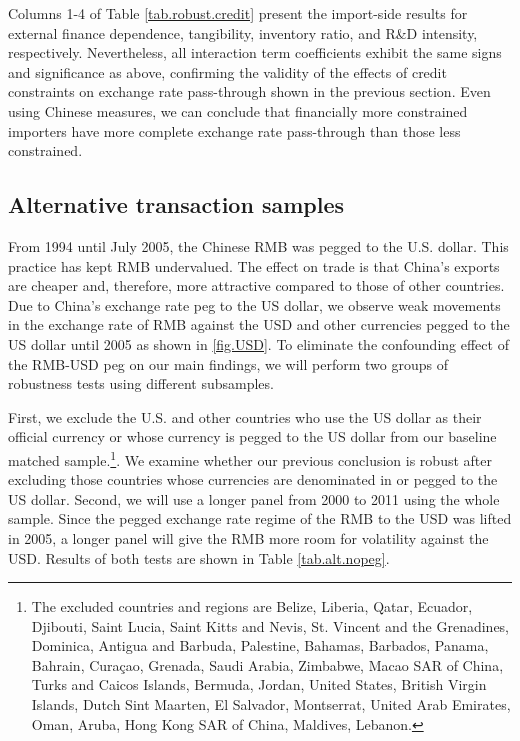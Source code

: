 \documentclass[12pt]{article}
\begin{document}
Columns 1-4 of Table \ref{tab.robust.credit} present the import-side results for external finance dependence, tangibility, inventory ratio, and R\&D intensity, respectively. Nevertheless, all interaction term coefficients exhibit the same signs and significance as above, confirming the validity of the effects of credit constraints on exchange rate pass-through shown in the previous section. Even using Chinese measures, we can conclude that financially more constrained importers have more complete exchange rate pass-through than those less constrained.

\subsection{Alternative transaction samples}

From 1994 until July 2005, the Chinese RMB was pegged to the U.S. dollar. This practice has kept RMB undervalued. The effect on trade is that China's exports are cheaper and, therefore, more attractive compared to those of other countries. Due to China's exchange rate peg to the US dollar, we observe weak movements in the exchange rate of RMB against the USD and other currencies pegged to the US dollar until 2005 as shown in \ref{fig.USD}. To eliminate the confounding effect of the RMB-USD peg on our main findings, we will perform two groups of robustness tests using different subsamples.

First, we exclude the U.S. and other countries who use the US dollar as their official currency or whose currency is pegged to the US dollar from our baseline matched sample.\footnote{The excluded countries and regions are Belize, Liberia, Qatar, Ecuador, Djibouti, Saint Lucia, Saint Kitts and Nevis, St. Vincent and the Grenadines, Dominica, Antigua and Barbuda, Palestine, Bahamas, Barbados, Panama, Bahrain, Curaçao, Grenada, Saudi Arabia, Zimbabwe, Macao SAR of China, Turks and Caicos Islands, Bermuda, Jordan, United States, British Virgin Islands, Dutch Sint Maarten, El Salvador, Montserrat, United Arab Emirates, Oman, Aruba, Hong Kong SAR of China, Maldives, Lebanon.}. We examine whether our previous conclusion is robust after excluding those countries whose currencies are denominated in or pegged to the US dollar. Second, we will use a longer panel from 2000 to 2011 using the whole sample. Since the pegged exchange rate regime of the RMB to the USD was lifted in 2005, a longer panel will give the RMB more room for volatility against the USD. Results of both tests are shown in Table \ref{tab.alt.nopeg}.
\end{document}
